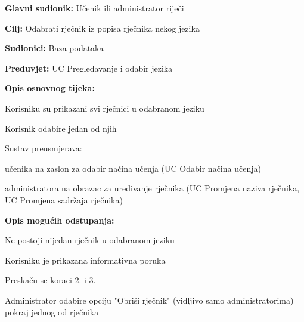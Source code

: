 \noindent {}
\begin{packed_item}

	\item \textbf{Glavni sudionik: } Učenik ili administrator riječi
	\item \textbf{Cilj: } Odabrati rječnik iz popisa rječnika nekog jezika
	\item \textbf{Sudionici: } Baza podataka
	\item \textbf{Preduvjet: } UC Pregledavanje i odabir jezika
	\item  \textbf{Opis osnovnog tijeka:}
	
	\item[] \begin{packed_enum}
		
		\item Korisniku su prikazani svi rječnici u odabranom jeziku
		\item Korisnik odabire jedan od njih
		\item Sustav preusmjerava:
		\item[] \begin{packed_item}
		
			\item učenika na zaslon za odabir načina učenja (UC Odabir načina učenja)
			\item administratora na obrazac za uređivanje rječnika (UC Promjena naziva rječnika, UC Promjena sadržaja rječnika)
			
		\end{packed_item}

	\end{packed_enum}

	\item  \textbf{Opis mogućih odstupanja:}
	
	\item[] \begin{packed_item}

		\item[1.a] Ne postoji nijedan rječnik u odabranom jeziku
		\item[] \begin{packed_enum}
			
			\item Korisniku je prikazana informativna poruka
			\item Preskaču se koraci 2. i 3.
			
		\end{packed_enum}
		\item[2.a] Administrator odabire opciju "Obriši rječnik" (vidljivo samo administratorima) pokraj jednog od rječnika
		\item[] \begin{packed_enum}
			

\end{packed_enum}
\end{packed_item}
\end{packed_item}
